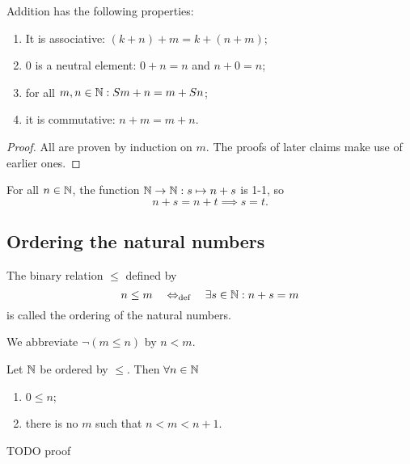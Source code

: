 \begin{proposition}
Addition has the following properties:
\begin{enumerate}
\item It is associative: $(k+n)+m = k+(n+m)$;
\item $0$ is a neutral element: $0+n = n$ and $n+0 = n$;
\item for all $m,n\in \mathbb{N}: Sm+n = m+Sn$;
\item it is commutative: $n+m = m+n$.
\end{enumerate}
\end{proposition}
\begin{proof}
All are proven by induction on $m$. The proofs of later claims make use of earlier ones.
\end{proof}
\begin{lemma}
For all $n\in \mathbb{N}$, the function $\mathbb{N}\to \mathbb{N}: s\mapsto n+s$ is 1-1, so
\[n+s = n+t \implies s=t.\]
\end{lemma}

\subsection{Ordering the natural numbers}
\begin{definition}
The binary relation $\leq$ defined by
\[ n \leq m \quad\Leftrightarrow_{\text{def}}\quad \exists s\in \mathbb{N}: n+s = m \]
is called the ordering of the natural numbers.

We abbreviate $\neg(m\leq n)$ by $n < m$.
\end{definition}

\begin{lemma} \label{orderingN}
Let $\mathbb{N}$ be ordered by $\leq$. Then $\forall n\in\mathbb{N}$
\begin{enumerate}
\item $0\leq n$;
\item there is no $m$ such that $n<m<n+1$.
\end{enumerate}
\end{lemma}
TODO proof


